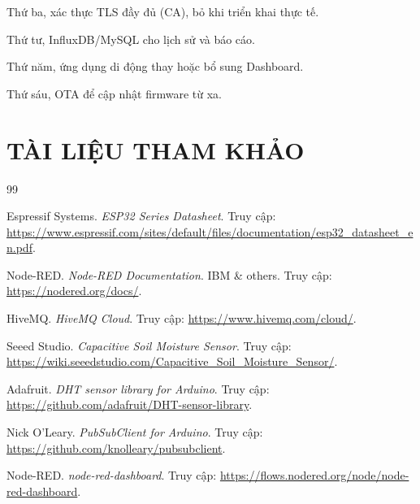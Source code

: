 \documentclass[12pt, a4paper]{article}
\newcommand{\code}[1]{\texttt{\detokenize{#1}}}
\begin{document}
Thứ ba, xác thực TLS đầy đủ (CA), bỏ \code{setInsecure()} khi triển khai thực tế.

Thứ tư, InfluxDB/MySQL cho lịch sử và báo cáo.

Thứ năm, ứng dụng di động thay hoặc bổ sung Dashboard.

Thứ sáu, OTA để cập nhật firmware từ xa.

\newpage
{}
\section*{TÀI LIỆU THAM KHẢO}
{}
\label{sec:tailieu}

\begin{thebibliography}{99}
  \fontsize{13}{17}\selectfont

   Espressif Systems. \textit{ESP32 Series Datasheet}. Truy cập: \url{https://www.espressif.com/sites/default/files/documentation/esp32_datasheet_en.pdf}.

   Node-RED. \textit{Node-RED Documentation}. IBM \& others. Truy cập: \url{https://nodered.org/docs/}.

   HiveMQ. \textit{HiveMQ Cloud}. Truy cập: \url{https://www.hivemq.com/cloud/}.

   Seeed Studio. \textit{Capacitive Soil Moisture Sensor}. Truy cập: \url{https://wiki.seeedstudio.com/Capacitive_Soil_Moisture_Sensor/}.

   Adafruit. \textit{DHT sensor library for Arduino}. Truy cập: \url{https://github.com/adafruit/DHT-sensor-library}.

   Nick O'Leary. \textit{PubSubClient for Arduino}. Truy cập: \url{https://github.com/knolleary/pubsubclient}.

   Node-RED. \textit{node-red-dashboard}. Truy cập: \url{https://flows.nodered.org/node/node-red-dashboard}.

\end{thebibliography}

\newpage
\end{document}
